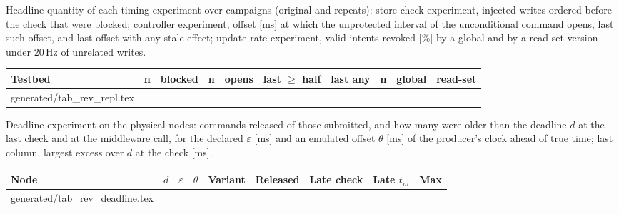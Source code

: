 \documentclass[11pt]{article}
\makeatletter
\newcommand{\gen}[1]{\@@input generated/#1.tex }
\makeatother
\begin{document}
Headline quantity of each timing experiment over campaigns (original and repeats): store-check experiment, injected writes ordered before the check that were blocked; controller experiment, offset [ms] at which the unprotected interval of the unconditional command opens, last such offset, and last offset with any stale effect; update-rate experiment, valid intents revoked [\%] by a global and by a read-set version under 20\,Hz of unrelated writes.

\begin{center}\footnotesize\setlength{\tabcolsep}{3.5pt}
\begin{tabular}{@{}lccccccccc@{}}
\toprule
Testbed & n & blocked & n & opens & last $\ge$ half & last any & n & global & read-set \\
\midrule
\gen{tab_rev_repl}
\bottomrule
\end{tabular}\end{center}

Deadline experiment on the physical nodes: commands released of those submitted, and how many were older than the deadline $d$ at the last check and at the middleware call, for the declared $\varepsilon$ [ms] and an emulated offset $\theta$ [ms] of the producer's clock ahead of true time; last column, largest excess over $d$ at the check [ms].

\begin{center}\footnotesize\setlength{\tabcolsep}{3.5pt}
\begin{tabular}{@{}lcccrccrc@{}}
\toprule
Node & $d$ & $\varepsilon$ & $\theta$ & Variant & Released & Late check & Late $t_m$ & Max \\
\midrule
\gen{tab_rev_deadline}
\bottomrule
\end{tabular}\end{center}
\end{document}
